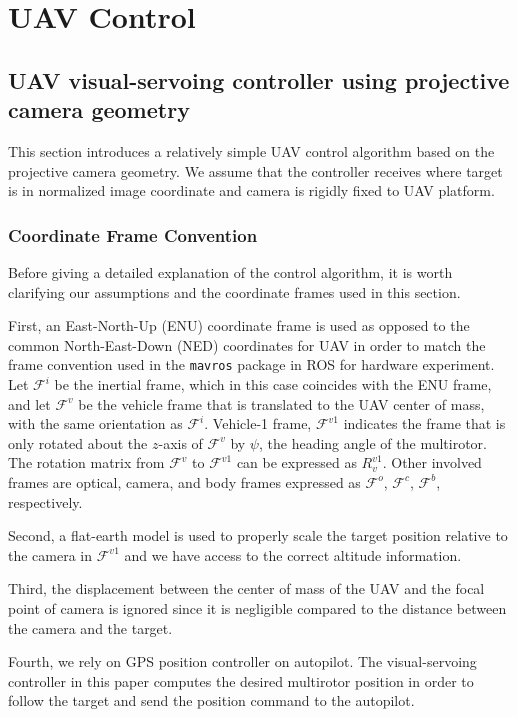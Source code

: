 \chapter{UAV Control}

\section{UAV visual-servoing controller using projective camera geometry}
This section introduces a relatively simple UAV control algorithm based on the projective camera geometry. We assume that the controller receives where target is in normalized image coordinate and camera is rigidly fixed to UAV platform. 

\subsection{Coordinate Frame Convention}
Before giving a detailed explanation of the control algorithm, it is worth clarifying our assumptions and the coordinate frames used in this section. 

First, an East-North-Up (ENU) coordinate frame is used as opposed to the common North-East-Down (NED) coordinates for UAV in order to match the frame convention used in the \texttt{mavros} package in ROS for hardware experiment. Let $\mathcal{F}^i$ be the inertial frame, which in this case coincides with the ENU frame, and let $\mathcal{F}^v$ be the vehicle frame that is translated to the UAV center of mass, with the same orientation as $\mathcal{F}^i$. Vehicle-1 frame, $\mathcal{F}^{v1}$ indicates the frame that is only rotated about the $z$-axis of $\mathcal{F}^{v}$ by $\psi$, the heading angle of the multirotor. The rotation matrix from $\mathcal{F}^v$ to $\mathcal{F}^{v1}$ can be expressed as $R^{v1}_v$. Other involved frames are optical, camera, and body frames expressed as $\mathcal{F}^o$, $\mathcal{F}^c$, $\mathcal{F}^b$, respectively. 

Second, a flat-earth model is used to properly scale the target position relative to the camera in $\mathcal{F}^{v1}$ and we have access to the correct altitude information. 

Third, the displacement between the center of mass of the UAV and the focal point of camera is ignored since it is negligible compared to the distance between the camera and the target. 

Fourth, we rely on GPS position controller on autopilot. The visual-servoing controller in this paper computes the desired multirotor position in order to follow the target and send the position command to the autopilot.

